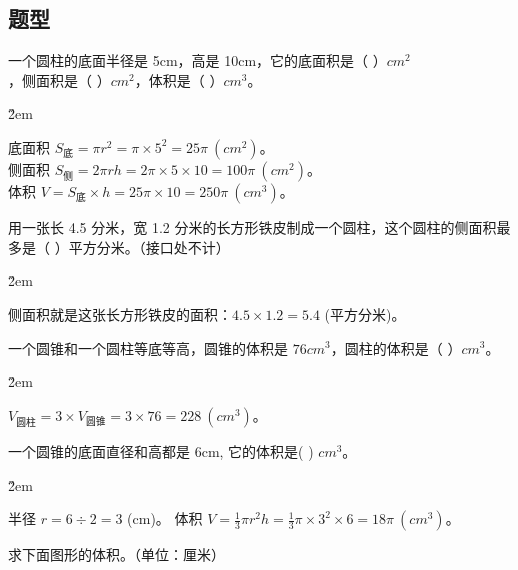 \subsection*{题型}
\begin{example}
    一个圆柱的底面半径是 5cm，高是 10cm，它的底面积是（ \quad ）$cm^2$，侧面积是（ \quad ）$cm^2$，体积是（ \quad ）$cm^3$。
\end{example}

\v{2em}

\begin{solution}
    底面积 $S_{底} = \pi r^2 = \pi \times 5^2 = 25\pi \ (cm^2)$。\\
    侧面积 $S_{侧} = 2\pi r h = 2\pi \times 5 \times 10 = 100\pi \ (cm^2)$。\\
    体积 $V = S_{底} \times h = 25\pi \times 10 = 250\pi \ (cm^3)$。
\end{solution}

\begin{example}
    用一张长 4.5 分米，宽 1.2 分米的长方形铁皮制成一个圆柱，这个圆柱的侧面积最多是（ \quad ）平方分米。（接口处不计）
\end{example}

\v{2em}

\begin{solution}
    侧面积就是这张长方形铁皮的面积：$4.5 \times 1.2 = 5.4$ (平方分米)。
\end{solution}

\begin{example}
    一个圆锥和一个圆柱等底等高，圆锥的体积是 $76cm^3$，圆柱的体积是（ \quad ）$cm^3$。
\end{example}

\v{2em}

\begin{solution}
    $V_{圆柱} = 3 \times V_{圆锥} = 3 \times 76 = 228 \ (cm^3)$。
\end{solution}

\begin{example}
    一个圆锥的底面直径和高都是 6cm, 它的体积是( \quad ) $cm^3$。
\end{example}

\v{2em}

\begin{solution}
    半径 $r = 6 \div 2 = 3$ (cm)。
    体积 $V = \frac{1}{3}\pi r^2 h = \frac{1}{3} \pi \times 3^2 \times 6 = 18\pi \ (cm^3)$。
\end{solution}

\begin{example}
    求下面图形的体积。（单位：厘米）
\end{example}

